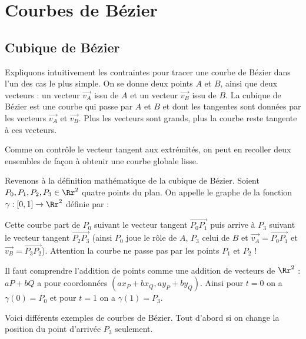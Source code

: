 \documentclass[11pt,class=report,crop=false]{standalone}
\begin{document}
\section{Courbes de Bézier}

\subsection{Cubique de Bézier}


Expliquons intuitivement les contraintes pour tracer une courbe de Bézier dans l'un des cas le plus simple.
On se donne deux points $A$ et $B$, ainsi que deux vecteurs : un vecteur $\vec{v_A}$ issu de $A$ et un vecteur $\vec{v_B}$ issu de $B$.
La cubique de Bézier est une courbe qui passe par $A$ et $B$ et dont les tangentes sont données par les vecteurs $\vec{v_A}$ et $\vec{v_B}$.
Plus les vecteurs sont grands, plus la courbe reste tangente à ces vecteurs.


Comme on contrôle le vecteur tangent aux extrémités, on peut en recoller deux ensembles de façon à obtenir une courbe globale lisse.


Revenons à la définition mathématique de la cubique de Bézier.
Soient $P_0,P_1,P_2,P_3 \in \Rr^2$ quatre points du plan. 
On appelle  le graphe de la fonction $\gamma : [0,1] \to \Rr^2$ définie par :

Cette courbe part de $P_0$ suivant le vecteur tangent $\vec{P_0P_1}$ puis arrive à $P_3$ suivant le vecteur tangent $\vec{P_2P_3}$
(ainsi $P_0$ joue le rôle de $A$, $P_3$ celui de $B$ et $\vec{v_A} = \vec{P_0P_1}$ et $\vec{v_B} = \vec{P_3P_2}$).
Attention la courbe ne passe pas par les points $P_1$ et $P_2$ !



Il faut comprendre l'addition de points comme une addition de vecteurs de $\Rr^2$ : 
$aP+bQ$ a pour coordonnées $(a x_P + b x_Q, a y_P + b y_Q)$.
Ainsi pour $t = 0$ on a $\gamma(0) = P_0$ et pour $t = 1$ on a $\gamma(1) = P_3$.

Voici différents exemples de courbes de Bézier.
Tout d'abord si on change la position du point d'arrivée $P_3$ seulement.
\end{document}
